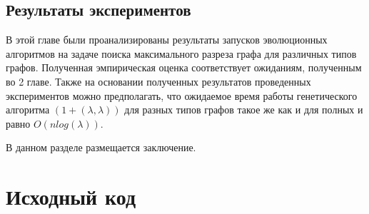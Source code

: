 \documentclass[times]{itmo-student-thesis}
\newcommand{\alglambda}{${(1 + (\lambda , \lambda))}$\xspace}
\begin{document}
\section{Результаты экспериментов}

\chapterconclusion
В этой главе были проанализированы результаты запусков эволюционных алгоритмов на задаче поиска максимального разреза графа для различных типов графов. Полученная эмпирическая оценка соответствует ожиданиям, полученным во 2 главе.
Также на основании полученных результатов проведенных экспериментов можно предполагать, что ожидаемое время работы генетического алгоритма \alglambda для разных типов графов такое же как и для полных и равно $O(nlog(\lambda))$.

\startconclusionpage

В данном разделе размещается заключение.

\printmainbibliography

\appendix

\chapter{Исходный код}\label{sec:app:1}
\end{document}
